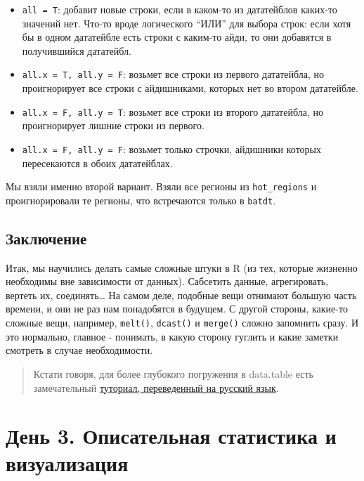 \documentclass[]{book}
\providecommand{\tightlist}{%
  \setlength{\itemsep}{0pt}\setlength{\parskip}{0pt}}
\begin{document}
\begin{itemize}
\tightlist
\item
  \texttt{all\ =\ T}: добавит новые строки, если в каком-то из
  дататейблов каких-то значений нет. Что-то вроде логического ``ИЛИ''
  для выбора строк: если хотя бы в одном дататейбле есть строки с
  каким-то айди, то они добавятся в получившийся дататейбл.\\
\item
  \texttt{all.x\ =\ T,\ all.y\ =\ F}: возьмет все строки из первого
  дататейбла, но проигнорирует все строки с айдишниками, которых нет во
  втором дататейбле.\\
\item
  \texttt{all.x\ =\ F,\ all.y\ =\ T}: возьмет все строки из второго
  дататейбла, но проигнорирует лишние строки из первого.\\
\item
  \texttt{all.x\ =\ F,\ all.y\ =\ F}: возьмет только строчки, айдишники
  которых пересекаются в обоих дататейблах.
\end{itemize}

Мы взяли именно второй вариант. Взяли все регионы из
\texttt{hot\_regions} и проигнорировали те регионы, что встречаются
только в \texttt{batdt}.

\section{Заключение}\label{day2_con}

Итак, мы научились делать самые сложные штуки в R (из тех, которые
жизненно необходимы вне зависимости от данных). Сабсетить данные,
агрегировать, вертеть их, соединять\ldots{} На самом деле, подобные вещи
отнимают большую часть времени, и они не раз нам понадобятся в будущем.
С другой стороны, какие-то сложные вещи, например, \texttt{melt()},
\texttt{dcast()} и \texttt{merge()} сложно запомнить сразу. И это
нормально, главное - понимать, в какую сторону гуглить и какие заметки
смотреть в случае необходимости.

\begin{quote}
Кстати говоря, для более глубокого погружения в data.table есть
замечательный
\href{https://bookdown.org/statist_/DataTableManual/01_data.table_intro.html}{туториал,
переведенный на русский язык}.
\end{quote}

\chapter{День 3. Описательная статистика и визуализация}\label{vis}
\end{document}
